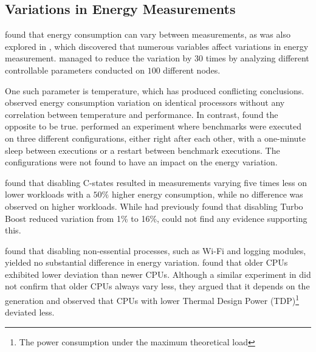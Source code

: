 \subsection{Variations in Energy Measurements}


\cite{biksbois} found that energy consumption can vary between measurements, as was also explored in \cite{Ournani2020}, which discovered that numerous variables affect variations in energy measurement. \cite{Ournani2020} managed to reduce the variation by $30$ times by analyzing different controllable parameters conducted on $100$ different nodes.

One such parameter is temperature, which has produced conflicting conclusions. \cite{Kistowski2016} observed energy consumption variation on identical processors without any correlation between temperature and performance. In contrast, \cite{Wang2018} found the opposite to be true. \cite{Ournani2020} performed an experiment where benchmarks were executed on three different configurations, either right after each other, with a one-minute sleep between executions or a restart between benchmark executions. The configurations were not found to have an impact on the energy variation. 

\cite{Ournani2020} found that disabling C-states resulted in measurements varying five times less on lower workloads with a $50\%$ higher energy consumption, while no difference was observed on higher workloads. While \cite{Acun2016} had previously found that disabling Turbo Boost reduced variation from 1\% to 16\%, \cite{Ournani2020} could not find any evidence supporting this.


\cite{Ournani2020} found that disabling non-essential processes, such as Wi-Fi and logging modules, yielded no substantial difference in energy variation. \cite{Marathe2017, Wang2019}  found that older CPUs exhibited lower deviation than newer CPUs. Although a similar experiment in \cite{Ournani2020} did not confirm that older CPUs always vary less, they argued that it depends on the generation and observed that CPUs with lower Thermal Design Power (TDP)\footnote{The power consumption under the maximum theoretical load\cite{tdp}} deviated less.




